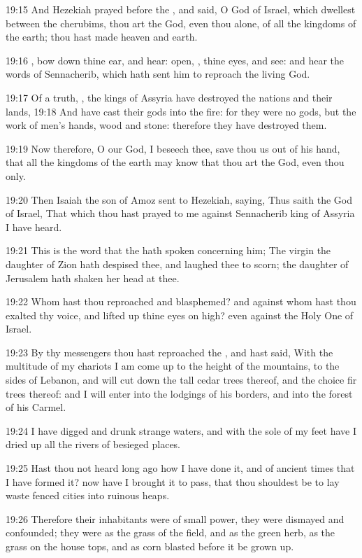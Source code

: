 19:15 And Hezekiah prayed before the \LORD, and said, O \LORD God of Israel, which dwellest between the cherubims, thou art the God, even thou alone, of all the kingdoms of the earth; thou hast made heaven and earth.

19:16 \LORD, bow down thine ear, and hear: open, \LORD, thine eyes, and see: and hear the words of Sennacherib, which hath sent him to reproach the living God.

19:17 Of a truth, \LORD, the kings of Assyria have destroyed the nations and their lands, 19:18 And have cast their gods into the fire: for they were no gods, but the work of men's hands, wood and stone: therefore they have destroyed them.

19:19 Now therefore, O \LORD our God, I beseech thee, save thou us out of his hand, that all the kingdoms of the earth may know that thou art the \LORD God, even thou only.

19:20 Then Isaiah the son of Amoz sent to Hezekiah, saying, Thus saith the \LORD God of Israel, That which thou hast prayed to me against Sennacherib king of Assyria I have heard.

19:21 This is the word that the \LORD hath spoken concerning him; The virgin the daughter of Zion hath despised thee, and laughed thee to scorn; the daughter of Jerusalem hath shaken her head at thee.

19:22 Whom hast thou reproached and blasphemed? and against whom hast thou exalted thy voice, and lifted up thine eyes on high? even against the Holy One of Israel.

19:23 By thy messengers thou hast reproached the \LORD, and hast said, With the multitude of my chariots I am come up to the height of the mountains, to the sides of Lebanon, and will cut down the tall cedar trees thereof, and the choice fir trees thereof: and I will enter into the lodgings of his borders, and into the forest of his Carmel.

19:24 I have digged and drunk strange waters, and with the sole of my feet have I dried up all the rivers of besieged places.

19:25 Hast thou not heard long ago how I have done it, and of ancient times that I have formed it? now have I brought it to pass, that thou shouldest be to lay waste fenced cities into ruinous heaps.

19:26 Therefore their inhabitants were of small power, they were dismayed and confounded; they were as the grass of the field, and as the green herb, as the grass on the house tops, and as corn blasted before it be grown up.

